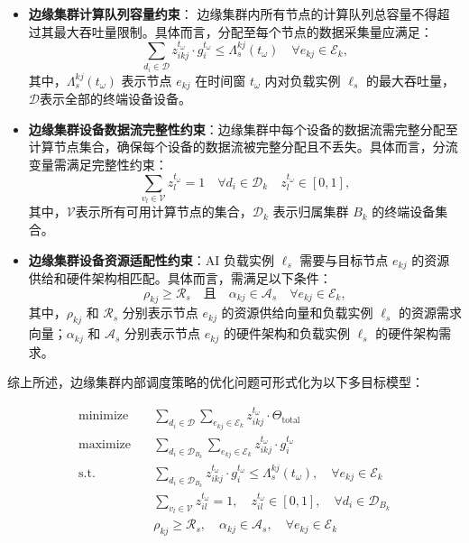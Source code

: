 \begin{itemize}
    \item \textbf{边缘集群计算队列容量约束}：  
    边缘集群内所有节点的计算队列总容量不得超过其最大吞吐量限制。具体而言，分配至每个节点的数据采集量应满足：
    \[
    \sum_{d_i \in \mathcal{D}} z_{ikj}^{t_\omega} \cdot g_i^{t_\omega} \leq \Lambda_s^{kj}(t_\omega) \quad \forall e_{kj} \in \mathcal{E}_k,
    \]
    其中，$\Lambda_s^{kj}(t_\omega)$ 表示节点 $e_{kj}$ 在时间窗 $t_\omega$ 内对负载实例 $\ell_s$ 的最大吞吐量，$\mathcal{D}$表示全部的终端设备设备。
    
    \item \textbf{边缘集群设备数据流完整性约束}：边缘集群中每个设备的数据流需完整分配至计算节点集合，确保每个设备的数据流被完整分配且不丢失。具体而言，分流变量需满足完整性约束：
    \[
    \sum_{v_l \in \mathcal{V}} z_{l}^{t_\omega} = 1 \quad \forall d_i \in \mathcal{D}_k \quad z_{l}^{t_\omega} \in [0, 1], 
    \]
    其中，$\mathcal{V}$表示所有可用计算节点的集合，$\mathcal{D}_k$ 表示归属集群 $B_k$ 的终端设备集合。
    
    \item \textbf{边缘集群设备资源适配性约束}：AI 负载实例 $\ell_s$ 需要与目标节点 $e_{kj}$ 的资源供给和硬件架构相匹配。具体而言，需满足以下条件：
    \[
    \rho_{kj} \geq \mathcal{R}_s \quad \text{且} \quad \alpha_{kj} \in \mathcal{A}_s \quad \forall e_{kj} \in \mathcal{E}_k ,
    \]
    其中，$\rho_{kj}$ 和 $\mathcal{R}_s$ 分别表示节点 $e_{kj}$ 的资源供给向量和负载实例 $\ell_s$ 的资源需求向量；$\alpha_{kj}$ 和 $\mathcal{A}_s$ 分别表示节点 $e_{kj}$ 的硬件架构和负载实例 $\ell_s$ 的硬件架构需求。
\end{itemize}

综上所述，边缘集群内部调度策略的优化问题可形式化为以下多目标模型：

\[
\begin{aligned}
\mathop{\text{minimize}}\quad & \sum_{d_i \in \mathcal{D}} \sum_{e_{kj} \in \mathcal{E}_k} z_{ikj}^{t_\omega} \cdot \Theta_{\text{total}} \\
\mathop{\text{maximize}}\quad & \sum_{d_i \in \mathcal{D}_{B_k}} \sum_{e_{kj} \in \mathcal{E}_k} z_{ikj}^{t_\omega} \cdot g_i^{t_\omega} \\
\text{s.t.}\quad 
& \sum_{d_i \in \mathcal{D}_{B_k}} z_{ikj}^{t_\omega} \cdot g_i^{t_\omega} \leq \Lambda_s^{kj}(t_\omega), \quad \forall e_{kj} \in \mathcal{E}_k \\
& \sum_{v_{l} \in \mathcal{V}} z_{il}^{t_\omega} = 1, \quad z_{il}^{t_\omega} \in [0,1], \quad \forall d_i \in \mathcal{D}_{B_k} \\
& \rho_{kj} \geq \mathcal{R}_s, \quad \alpha_{kj} \in \mathcal{A}_s, \quad \forall e_{kj} \in \mathcal{E}_k 
\end{aligned}
\label{eq:cluster_scheduling}
\]

